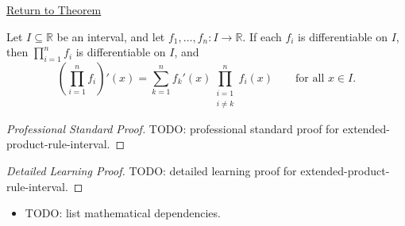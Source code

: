\newpage
{}
\label{prf:extended-product-rule-interval}

\begin{remark*}[Return]
\hyperref[cor:extended-product-rule-interval]{Return to Theorem}
\end{remark*}

\begin{corollary*}
Let $I \subseteq \mathbb{R}$ be an interval, and let $f_1, \dots, f_n : I \to \mathbb{R}$. If each $f_i$ is differentiable on $I$, then $\prod_{i=1}^{n} f_i$ is differentiable on $I$, and
\[
\left(\prod_{i=1}^{n} f_i\right)'(x)
= \sum_{k=1}^{n} f_k'(x) \prod_{\substack{i=1\\i\neq k}}^{n} f_i(x)
\qquad \text{for all } x \in I.
\]
\end{corollary*}

\begin{proof}[Professional Standard Proof]
\LRAProofBodyStart
TODO: professional standard proof for extended-product-rule-interval.
\end{proof}

\begin{proof}[Detailed Learning Proof]
\LRAProofBodyStart
TODO: detailed learning proof for extended-product-rule-interval.
\end{proof}

\begin{remark*}
\end{remark*}

\begin{dependencies}
\begin{itemize}
  \item TODO: list mathematical dependencies.
\end{itemize}
\end{dependencies}

\clearpage
